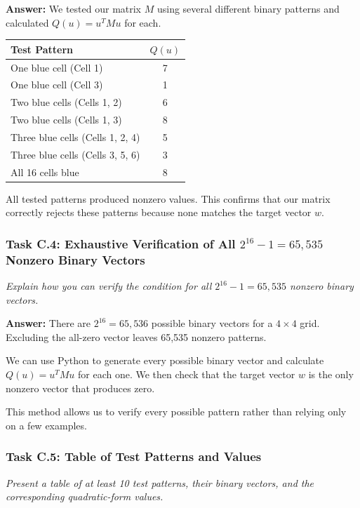 \documentclass[11pt]{article}
\begin{document}
\vspace{0.4em}
\textbf{Answer:} 
We tested our matrix $M$ using several different binary patterns and calculated $Q(u)=u^TMu$ for each.
\begin{center}
\begin{tabular}{|l|c|}
\hline
Test Pattern & $Q(u)$ \\
\hline
One blue cell (Cell 1) & 7 \\
One blue cell (Cell 3) & 1 \\
Two blue cells (Cells 1, 2) & 6 \\
Two blue cells (Cells 1, 3) & 8 \\
Three blue cells (Cells 1, 2, 4) & 5 \\
Three blue cells (Cells 3, 5, 6) & 3 \\
All 16 cells blue & 8 \\
\hline
\end{tabular}
\end{center}
All tested patterns produced nonzero values. This confirms that our matrix correctly rejects these patterns because none matches the target vector $w$.

\vspace{0.5em}

\subsubsection*{Task C.4: Exhaustive Verification of All $2^{16} - 1 = 65,535$ Nonzero Binary Vectors}
\textit{Explain how you can verify the condition for all $2^{16} - 1 = 65,535$ nonzero binary vectors.}

\vspace{0.4em}
\textbf{Answer:} 
There are $2^{16} = 65,536$ possible binary vectors for a $4 \times 4$ grid. Excluding the all-zero vector leaves 65,535 nonzero patterns.

We can use Python to generate every possible binary vector and calculate $Q(u) = u^T M u$ for each one. We then check that the target vector $w$ is the only nonzero vector that produces zero.

This method allows us to verify every possible pattern rather than relying only on a few examples.

\vspace{0.5em}

\subsubsection*{Task C.5: Table of Test Patterns and Values}
\textit{Present a table of at least 10 test patterns, their binary vectors, and the corresponding quadratic-form values.}
\end{document}
